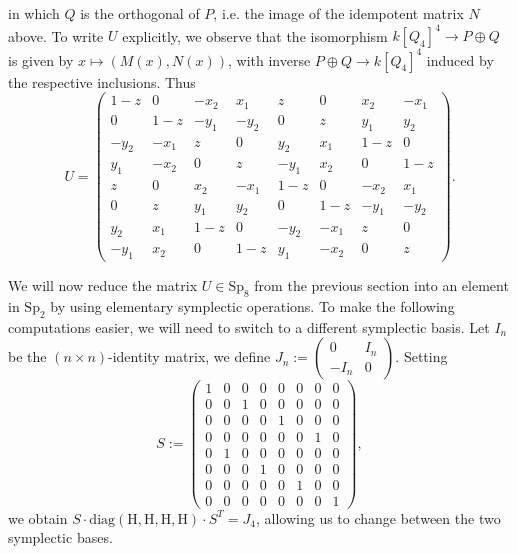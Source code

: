 \documentclass[11pt,leqno]{article}
\renewcommand{\1}{{\rm 1\hspace*{-0.4ex}%
\rule{0.1ex}{1.52ex}\hspace*{0.2ex}}}
\newcommand{\<}[1]{{\langle}#1 {\rangle}}
\theoremstyle{plain}
\theoremstyle{definition}
\theoremstyle{remark}
\numberwithin{equation}{section}
\begin{document}
in which $Q$ is the orthogonal of $P$, i.e. the image of the idempotent matrix $N$ above.
To write $U$ explicitly, we observe that the isomorphism $k[Q_4]^4\to P\oplus Q$ is given by $x\mapsto (M(x),N(x))$, with inverse $P\oplus Q\to k[Q_4]^4$ induced by the respective inclusions. Thus
\[
U=\begin{pmatrix} 1-z & 0 & -x_2 & x_1 & z & 0 & x_2 & -x_1 \\ 0 & 1-z & -y_1 & -y_2 & 0 & z & y_1 & y_2 \\
-y_2 & -x_1 & z & 0 & y_2 & x_1 & 1-z & 0 \\ y_1 & -x_2 & 0 & z & -y_1 & x_2 & 0 & 1-z \\
z & 0 & x_2 & -x_1 & 1-z & 0 & -x_2 & x_1 \\ 0 & z & y_1 & y_2 & 0 & 1-z & -y_1 & -y_2 \\
y_2 & x_1 & 1-z & 0 & -y_2 & -x_1 & z & 0 \\ -y_1 & x_2 & 0 & 1-z & y_1 & -x_2 & 0 & z\end{pmatrix}.
\]

We will now reduce the matrix $U\in\mathrm{Sp}_8$ from the previous section into an element in $\mathrm{Sp}_2$ by using elementary symplectic operations. To make the following computations easier, we will need to switch to a different symplectic basis. Let $I_n$ be the $(n \times n)$-identity matrix, we define $J_n := \begin{pmatrix}
    0 & I_n \\ -I_n & 0
\end{pmatrix}$. Setting 
 \begin{equation*}
     S := \begin{pmatrix}
    1& 0& 0& 0& 0& 0& 0& 0\\ 0& 0& 1& 0& 0& 0& 0& 0\\ 0& 0& 0& 0& 1& 0& 0& 0\\ 0& 0& 0& 0& 0& 0& 1& 0\\ 0&
      1& 0& 0& 0& 0& 0& 0\\ 0& 0& 0& 1& 0& 0& 0& 0\\ 0& 0& 0& 0& 0& 1& 0& 0\\ 0& 0& 0& 0& 0& 0& 0& 1
\end{pmatrix},
\end{equation*}
we obtain 
$S \cdot \mathrm{diag(H,H,H,H)} \cdot S^T = J_4$, allowing us to change between the two symplectic bases. 
\end{document}
